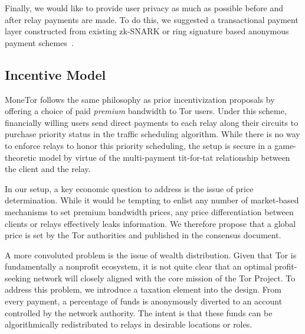 Finally, we would like to provide user privacy as much as possible before and
after relay payments are made. To do this, we suggested a transactional payment
layer constructed from existing zk-SNARK or ring signature based anonymous
payment schemes~\cite{sasson2014zerocash, van2013cryptonote}.

\subsection{Incentive Model}
MoneTor follows the same philosophy as prior incentivization proposals by
offering a choice of paid \emph{premium} bandwidth to Tor users. Under this
scheme, financially willing users send direct payments to each relay along their
circuits to purchase priority status in the traffic scheduling
algorithm. While there is no way to enforce relays to honor this priority
scheduling, the setup is secure in a game-theoretic model by virtue of the
multi-payment tit-for-tat relationship between the client and the relay.

In our setup, a key economic question to address is the issue of price
determination. While it would be tempting to enlist any number of market-based
mechanisms to set premium bandwidth prices, any price differentiation between
clients or relays effectively leaks information. We therefore propose that a
global price is set by the Tor authorities and published in the consensus
document.

A more convoluted problem is the issue of wealth distribution. Given that Tor is
fundamentally a nonprofit ecosystem, it is not quite clear that an optimal
profit-seeking network will closely aligned with the core mission of the Tor
Project. To address this problem, we introduce a taxation element into the
design. From every payment, a percentage of funds is anonymously diverted to an
account controlled by the network authority. The intent is that these funds can
be algorithmically redistributed to relays in desirable locations or roles.